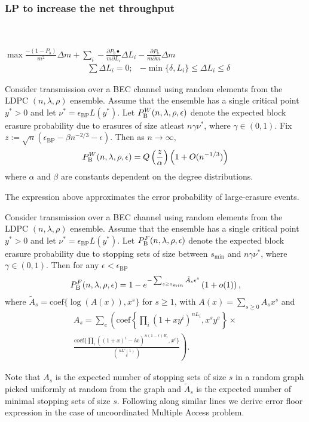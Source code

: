 \subsubsection*{LP to increase the net throughput}~\\ \\ $\max \frac{-(1-P_b)}{m^2}\Delta m+\sum_{i}-\frac{\partial P_b•}{m\partial L_i}\Delta L_i- \frac{~\partial P_b}{m\partial m}\Delta m$
\begin{align*}
&\sum \Delta L_i=0;      & -\min\{\delta,L_{i}\}\leq \Delta L_i\leq \delta
\end{align*}

\begin{theorem}
Consider transmission over a BEC channel using random elements from the LDPC $(n,\lambda,\rho)$ ensemble. Assume that the ensemble has a single critical point $y^*>0$ and let $\nu^*=\epsilon_{\text{BP}}L(y^*)$. Let $P_{\text{B}}^{W}(n,\lambda,\rho,\epsilon)$ denote the expected block erasure probability due to erasures of size atleast $n\gamma \nu^{*}$, where $\gamma\in (0,1)$. Fix $z:=\sqrt{n}(\epsilon_{\text{BP}}-\beta n^{-2/3}-\epsilon)$. Then as $n\rightarrow \infty ,$
\begin{align*}
P_{\text{B}}^{W}(n,\lambda,\rho,\epsilon)=Q\left(\frac{z}{\alpha}\right)\left(1+O(n^{-1/3})\right)
\end{align*}
where $\alpha$ and $\beta$ are constants dependent on the degree distributions.
\end{theorem}
The expression above approximates the error probability of large-erasure events.

\begin{theorem}
Consider transmission over a BEC channel using random elements from the LDPC $(n,\lambda,\rho)$ ensemble. Assume that the ensemble has a single critical point $y^*>0$ and let $\nu^*=\epsilon_{\text{BP}}L(y^*)$. Let $P_{\text{B}}^{F}(n,\lambda,\rho,\epsilon)$ denote the expected block erasure probability due to stopping sets of size between $s_{\text{min}}$ and  $n\gamma \nu^{*}$, where $\gamma\in (0,1)$. Then for any $\epsilon<\epsilon_{\text{BP}}$
\begin{align*}
P_{\text{B}}^{F}(n,\lambda,\rho,\epsilon)=1-e^{-\sum_{s\geq s_{min}}\tilde{A}_{s}\epsilon^s}\left(1+o(1)\right),
\end{align*}
where $\tilde{A}_{s}=\text{coef}\{\log(A(x)),x^s\}$ for $s\geq 1$, with $A(x)=\sum_{s\geq 0} A_{s}x^s$ and
\begin{multline}
A_{s}=\sum_{e}\left( \text{coef}\left\lbrace\prod_{i} (1+xy^{i})^{nL_{i}}, x^{s}y^{e} \right\rbrace \right.\times \\
\left.\frac{\text{coef}\lbrace \prod_{i}\left((1+x)^i -ix \right)^{n(1-r)R_{i}},x^{e}\rbrace}{\binom{nL'(1)}{e}}\right).
\end{multline}
\end{theorem}
Note that $A_{s}$ is the expected number of stopping sets of size $s$ in a random graph picked uniformly at random from the graph and $\tilde{A}_{s}$ is the expected number of minimal stopping sets of size $s$. Following along similar lines we derive error floor expression in the case of uncoordinated Multiple Access problem.


